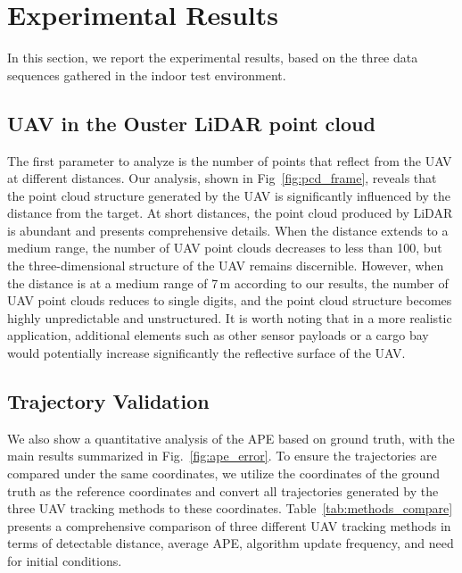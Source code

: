 \section{Experimental Results}

In this section, we report the experimental results, based on the three data sequences gathered in the indoor test environment. 

\subsection{UAV in the Ouster LiDAR point cloud}

The first parameter to analyze is the number of points that reflect from the UAV at different distances. Our analysis, shown in Fig~\ref{fig:pcd_frame}, reveals that the point cloud structure generated by the UAV is significantly influenced by the distance from the target. At short distances, the point cloud produced by LiDAR is abundant and presents comprehensive details. When the distance extends to a medium range, the number of UAV point clouds decreases to less than 100, but the three-dimensional structure of the UAV remains discernible. However, when the distance is at a medium range of 7\,m according to our results, the number of UAV point clouds reduces to single digits, and the point cloud structure becomes highly unpredictable and unstructured. It is worth noting that in a more realistic application, additional elements such as other sensor payloads or a cargo bay would potentially increase significantly the reflective surface of the UAV. 



\subsection{Trajectory Validation}

We also show a quantitative analysis of the APE based on ground truth, with the main results summarized in Fig.~\ref{fig:ape_error}. To ensure the trajectories are compared under the same coordinates, we utilize the coordinates of the ground truth as the reference coordinates and convert all trajectories generated by the three UAV tracking methods to these coordinates. 
Table~\ref{tab:methods_compare} presents a comprehensive comparison of three different UAV tracking methods in terms of detectable distance, average APE, algorithm update frequency, and need for initial conditions. 


